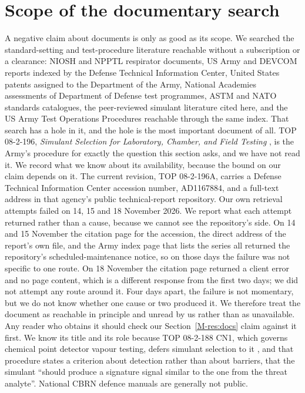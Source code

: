 \documentclass[11pt,a4paper]{article}
\begin{document}
\section{Scope of the documentary search}
\label{res:searchscope}



A negative claim about documents is only as good as its scope. We searched the
standard-setting and test-procedure literature reachable without a subscription
or a clearance: NIOSH and NPPTL respirator documents, US Army and DEVCOM reports
indexed by the Defense Technical Information Center, United States patents
assigned to the Department of the Army, National Academies assessments of
Department of Defense test programmes, ASTM and NATO standards catalogues, the
peer-reviewed simulant literature cited here, and the US Army Test Operations
Procedures reachable through the same index. That search has a hole in it, and
the hole is the most important document of all. TOP 08-2-196, \emph{Simulant
Selection for Laboratory, Chamber, and Field Testing} \cite{top082196}, is the
Army's procedure for exactly the question this section asks, and we have not
read it. We record what we know about its availability, because the bound on our
claim depends on it. The current revision, TOP 08-2-196A, carries a Defense
Technical Information Center accession number, AD1167884, and a full-text
address in that agency's public technical-report repository. Our own retrieval
attempts failed on 14, 15 and 18 November 2026. We report what each attempt
returned rather than a cause, because we cannot see the repository's side. On
14 and 15 November the citation page for the accession, the direct address of
the report's own file, and the Army index page that lists the series all
returned the repository's scheduled-maintenance notice, so on those days the
failure was not specific to one route. On 18 November the citation page
returned a client error and no page content, which is a different response from
the first two days; we did not attempt any route around it. Four days apart,
the failure is not momentary, but we do not know whether one cause or two
produced it. We therefore treat the document as reachable in
principle and unread by us rather than as unavailable. Any reader who obtains it should check our Section~\ref{M-res:docs}
claim against it first. We know its title and its role because TOP 08-2-188 CN1,
which governs chemical point detector vapour testing, defers simulant selection
to it \cite{top082188}, and that procedure states a criterion about detection
rather than about barriers, that the simulant ``should produce a signature
signal similar to the one from the threat analyte''. National CBRN defence
manuals are generally not public.
\end{document}
